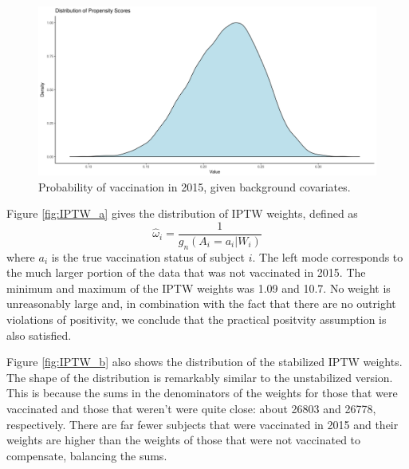 \documentclass[english, 12pt]{article}
\begin{document}
\begin{figure}[H]
    \centering
    \includegraphics[scale=0.5]{figures/propensity.png}
    \caption{Probability of vaccination in 2015, given background covariates.}
    \label{fig:propensity}
\end{figure}

Figure \ref{fig:IPTW_a} gives the distribution of IPTW weights, defined as
$$\hat{\omega}_i = \frac{1}{g_n(A_i = a_i|W_i)}$$
where $a_i$ is the true vaccination status of subject $i$. The left mode corresponds to the much larger portion of the data that was not vaccinated in 2015. The minimum and maximum of the IPTW weights was 1.09 and 10.7. No weight is unreasonably large and, in combination with the fact that there are no outright violations of positivity, we conclude that the practical positvity assumption is also satisfied.

Figure \ref{fig:IPTW_b} also shows the distribution of the stabilized IPTW weights. The shape of the distribution is remarkably similar to the unstabilized version. This is because the sums in the denominators of the weights for those that were vaccinated and those that weren't were quite close: about 26803 and 26778, respectively. There are far fewer subjects that were vaccinated in 2015 and their weights are higher than the weights of those that were not vaccinated to compensate, balancing the sums.
\end{document}
